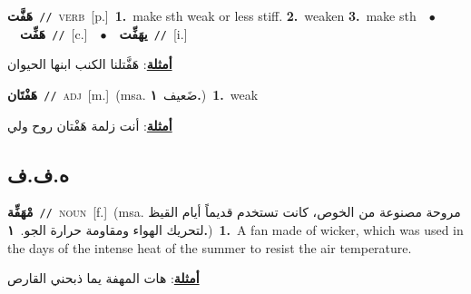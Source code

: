 \documentclass[10pt,a4paper,twoside]{article} %
\begin{document}
\begin{multicols}{2}
{\setlength\topsep{0pt}\textbf{\foreignlanguage{arabic}{هَفَّت}}\ {\color{gray}\texttt{//}\color{black}}\ \textsc{verb}\ [p.]\ \textbf{1.}~make sth weak or less stiff.  \textbf{2.}~weaken  \textbf{3.}~make sth\ \ $\bullet$\ \ \setlength\topsep{0pt}\textbf{\foreignlanguage{arabic}{هَفِّت}}\ {\color{gray}\texttt{//}\color{black}}\ [c.]\ \ $\bullet$\ \ \setlength\topsep{0pt}\textbf{\foreignlanguage{arabic}{يهَفِّت}}\ {\color{gray}\texttt{//}\color{black}}\ [i.]\  \begin{flushright}\color{gray}\foreignlanguage{arabic}{\textbf{\underline{\foreignlanguage{arabic}{أمثلة}}}: هَفَّتلنا الكنب ابنها الحيوان}\end{flushright}\color{black}} \vspace{2mm}

{\setlength\topsep{0pt}\textbf{\foreignlanguage{arabic}{هَفْتَان}}\ {\color{gray}\texttt{//}\color{black}}\ \textsc{adj}\ [m.]\ \color{gray}(msa. \foreignlanguage{arabic}{ضَعيف}~\foreignlanguage{arabic}{\textbf{١.}})\color{black}\ \textbf{1.}~weak\  \begin{flushright}\color{gray}\foreignlanguage{arabic}{\textbf{\underline{\foreignlanguage{arabic}{أمثلة}}}: أنت زلمة هَفْتان روح ولي}\end{flushright}\color{black}} \vspace{2mm}

\vspace{-3mm}
\subsection*{\color{blue}\foreignlanguage{arabic}{ه.ف.ف}\color{blue}{}} 

{\setlength\topsep{0pt}\textbf{\foreignlanguage{arabic}{مْهَفِّة}}\ {\color{gray}\texttt{//}\color{black}}\ \textsc{noun}\ [f.]\ \color{gray}(msa. \foreignlanguage{arabic}{مروحة مصنوعة من الخوص، كانت تستخدم قديماً أيام القيظ لتحريك الهواء ومقاومة حرارة الجو.}~\foreignlanguage{arabic}{\textbf{١.}})\color{black}\ \textbf{1.}~A fan made of wicker, which was used in the days of the intense heat of the summer to resist the air temperature.\  \begin{flushright}\color{gray}\foreignlanguage{arabic}{\textbf{\underline{\foreignlanguage{arabic}{أمثلة}}}: هات المهفة يما ذبحني القارص}\end{flushright}\color{black}} \vspace{2mm}


\end{multicols}
\end{document}
